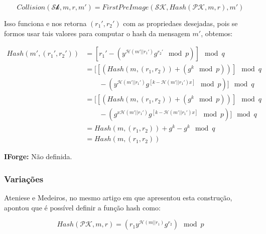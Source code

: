 \documentclass[a4paper]{article}
\begin{document}
$$ Collision(\mathcal{Sk}, m, r, m') = FirstPreImage(\mathcal{SK},
Hash(\mathcal{PK}, m, r), m')
$$

Isso funciona e nos retorna $(r_1', r_2')$ com as propriedaes
desejadas, pois se formos usar tais valores para computar o hash da
mensagem $m'$, obtemos:

\begin{equation}
\begin{split}
  Hash(m', (r_1', r_2')) &= \left[r_1'-(y^{\mathcal{H}(m'||r_1')}g^{r_2'} \mod p)\right] \mod q\\
  &=\big[\left[(Hash(m, (r_1, r_2)) + (g^k \mod p))\right] \mod q\\
    &\qquad-(y^{\mathcal{H}(m'||r_1')}g^{[k-\mathcal{H}(m'||r_1')x]} \mod p)\big] \mod q\\
  &=\big[\left[(Hash(m, (r_1, r_2)) + (g^k \mod p))\right] \mod q\\
    &\qquad-(g^{x\mathcal{H}(m'||r_1')}g^{[k-\mathcal{H}(m'||r_1')x]} \mod p)\big] \mod q\\
  &= Hash(m, (r_1, r_2)) + g^k - g^k \mod q\\
  &= Hash(m, (r_1, r_2))
\end{split}
\end{equation}

\textbf{IForge: }Não definida.

%




\subsubsection{Variações}

Ateniese e Medeiros, no mesmo artigo em que apresentou esta construção,
apontou que é possível definir a função hash como:

$$ Hash(\mathcal{PK}, m, r) =
\left(r_1y^{\mathcal{H}(m||r_1)}g^{r_2} \right)\mod p
$$
\end{document}
